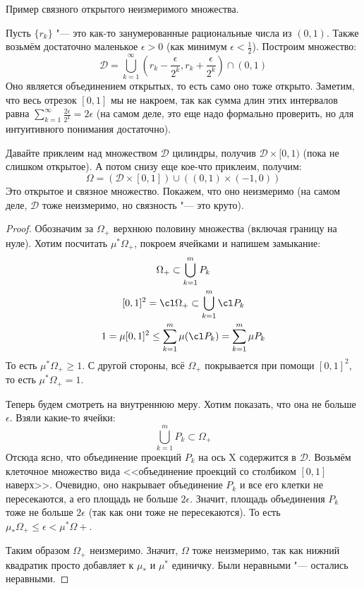 \begin{exmp}
	Пример связного открытого неизмеримого множества.

	Пусть $\{ r_k \}$ "--- это как-то занумерованные рациональные числа из $(0,1)$.
	Также возьмём достаточно маленькое $\epsilon > 0$ (как минимум $\epsilon < \frac 1 2$).
	Построим множество:
	\[
	\mathcal{D} = \bigcup_{k=1}^\infty \left(r_k - \frac{\epsilon}{2^k}, r_k + \frac{\epsilon}{2^k}\right) \cap (0,1)
	\]
	Оно является объединением открытых, то есть само оно тоже открыто.
	Заметим, что весь отрезок $[0,1]$ мы не накроем, так как сумма длин этих интервалов равна
	$\sum_{k=1}^\infty \frac{2\epsilon}{2^k} = 2\epsilon$
	(на самом деле, это еще надо формально проверить, но для интуитивного понимания достаточно).

	Давайте приклеим над множеством $\mathcal{D}$ цилиндры, получив $\mathcal{D} \times [0,1)$
	(пока не слишком открытое).
	А потом снизу еще кое-что приклеим, получим:
	\[ \Omega = (\mathcal{D} \times [0,1]) \cup ((0,1) \times (-1, 0)) \]
	Это открытое и связное множество.
	Покажем, что оно неизмеримо (на самом деле, $\mathcal{D}$ тоже неизмеримо, но связность "--- это круто).
\end{exmp}
\begin{proof}
	Обозначим за $\Omega_+$ верхнюю половину множества (включая границу на нуле).
	Хотим посчитать $\mu^* \Omega_+$, покроем ячейками и напишем замыкание:
	\begin{gather*}
		\Omega_+ \subset \bigcup_{k=1}^m P_k \\
		[0,1]^2 = \cl \Omega_+ \subset \bigcup_{k=1}^m \cl P_k \\
		1 = \mu [0,1]^2 \le \sum_{k=1}^m \mu(\cl P_k) = \sum_{k=1}^m \mu P_k
	\end{gather*}
	То есть $\mu^* \Omega_+ \ge 1$.
	С другой стороны, всё $\Omega_+$ покрывается при помощи $[0,1]^2$, то есть $\mu^* \Omega_+ = 1$.

	Теперь будем смотреть на внутреннюю меру.
	Хотим показать, что она не больше $\epsilon$.
	Взяли какие-то ячейки:
	\[
	\bigcup_{k=1}^m P_k \subset \Omega_+
	\]
	Отсюда ясно, что объединение проекций $P_k$ на ось X содержится в $\mathcal{D}$.
	Возьмём клеточное множество вида <<объединение проекций со столбиком $[0,1]$ наверх>>.
	Очевидно, оно накрывает объединение $P_k$ и все его клетки не пересекаются,
	а его площадь не больше $2 \epsilon$.
	Значит, площадь объединения $P_k$ тоже не больше $2\epsilon$ (так как они тоже не пересекаются).
	То есть $\mu_* \Omega_+ \le \epsilon < \mu^* \Omega+$.

	Таким образом $\Omega_+$ неизмеримо.
	Значит, $\Omega$ тоже неизмеримо, так как нижний квадратик просто добавляет к $\mu_*$ и $\mu^*$ единичку.
	Были неравными "--- остались неравными.
\end{proof}

